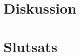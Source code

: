 \documentclass[a4paper]{article}
\begin{document}
\FloatBarrier

\section{Diskussion}

\section{Slutsats}
 
 {}
 
\end{document}
